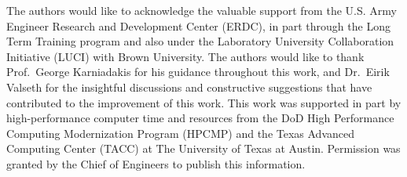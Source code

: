 \documentclass[draft]{agujournal2019}
\begin{document}
\acknowledgments
The authors would like to acknowledge the valuable support from the U.S. Army Engineer Research and Development Center (ERDC), in part through the Long Term Training program and also under the Laboratory University Collaboration Initiative (LUCI) with Brown University. The authors would like to thank Prof.~George Karniadakis for his guidance throughout this work, and Dr.~Eirik Valseth for the insightful discussions and constructive suggestions that have  contributed to the improvement of this work. This work was supported in part by high-performance computer time and resources from the DoD High Performance Computing Modernization Program (HPCMP) and the Texas Advanced Computing Center (TACC) at The University of Texas at Austin. Permission was granted by the Chief of Engineers to publish this information.



\clearpage

\appendix 


\end{document}
